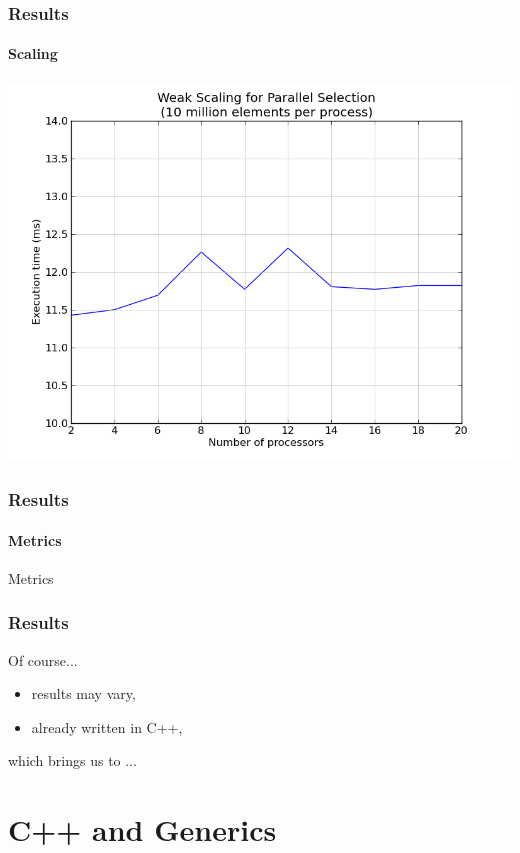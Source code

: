 \documentclass{beamer}
\begin{document}
\begin{frame}
  \frametitle{Results}
  \framesubtitle{Scaling}
  \begin{center}
    \includegraphics[width=.8\textwidth]{weak.png}
  \end{center}
\end{frame}

\begin{frame}
  \frametitle{Results}
  \framesubtitle{Metrics}
  \begin{block}{Metrics}
    \vspace{1cm}
    \hspace{0.5cm}{\Huge $x5$ per character changed.} \\
    \hspace{0.5cm}{\Huge $x2$ per second spent.}
    \vspace{1cm}
  \end{block}
\end{frame}

\begin{frame}
  \frametitle{Results}
  {\Huge Of course...} \\
  \vspace{.5cm}
  \begin{itemize}
    \item results may vary,
    \item already written in C++,
  \end{itemize}
  \vspace{.5cm}
  which brings us to ...
\end{frame}

\section{C++ and Generics}
\end{document}

